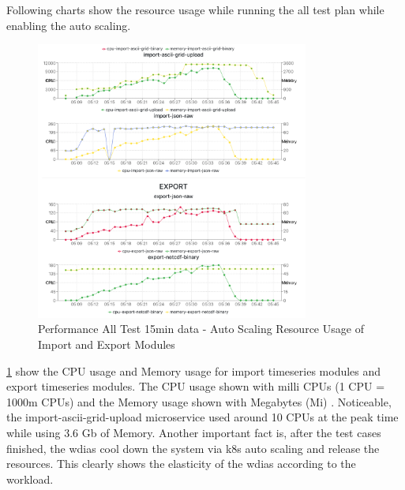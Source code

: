 Following charts show the resource usage while running the all test plan while enabling the auto scaling.
\begin{figure}[htp]
    \centering
    \includegraphics[width=0.8\textwidth]{results/obs/all_auto/obs_all_auto_15m_import_export_res.png}
    \caption{Performance All Test 15min data - Auto Scaling Resource Usage of Import and Export Modules }
    \label{fi:obs_all_auto_15m_import_export_res}
\end{figure}
\ref{fi:obs_all_auto_15m_import_export_res} show the CPU usage and Memory usage for import timeseries modules and export timeseries modules. The CPU usage shown with milli CPUs \cite{LinuxFoundationManagingKubernetes} (1 CPU = 1000m CPUs) and the Memory usage shown with Megabytes (Mi) \cite{LinuxFoundationManagingKubernetes}. Noticeable, the import-ascii-grid-upload microservice used around 10 CPUs at the peak time while using 3.6 Gb of Memory. Another important fact is, after the test cases finished, the \acrshort{wdias} cool down the system via \acrshort{k8s} auto scaling and release the resources. This clearly shows the elasticity of the \acrshort{wdias} according to the workload.

